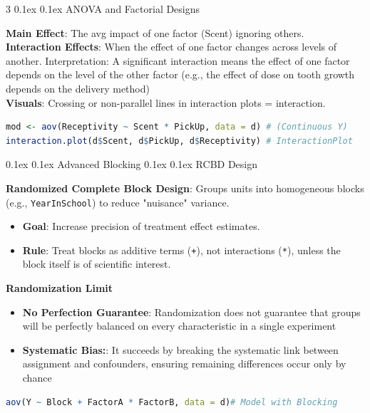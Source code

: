 \documentclass[8pt,landscape]{article}
\makeatletter
\renewcommand{\section}{\@startsection{section}{2}{0pt}%
    {0.1ex}%
    {0.1ex}%
    {\fontsize{8}{9}\bfseries\color{red}}} %
\renewcommand{\subsection}{\@startsection{subsection}{2}{0pt}%
    {0.1ex}%
    {0.1ex}%
    {\fontsize{8}{9}\bfseries\color{blue}}} %
\newcommand{\code}[1]{\textcolor{myred}{\texttt{#1}}}
\newcommand{\smalltext}[1]{
  {\fontsize{8}{9}\selectfont\sloppy #1\par}
}
\makeatother
\begin{document}
\begin{multicols}{3}
\section{ANOVA and Factorial Designs}
\smalltext{
\textbf{Main Effect}: The avg impact of one factor (Scent) ignoring others.\\
\textbf{Interaction Effects}: When the effect of one factor changes across levels of another. Interpretation: A significant interaction means the effect of one factor depends on the level of the other factor (e.g., the effect of dose on tooth growth depends on the delivery method)\\
\textbf{Visuals}: Crossing or non-parallel lines in interaction plots = interaction.
}
\begin{lstlisting}[language=R]
mod <- aov(Receptivity ~ Scent * PickUp, data = d) # (Continuous Y)
interaction.plot(d$Scent, d$PickUp, d$Receptivity) # InteractionPlot
\end{lstlisting}

\section{Advanced Blocking}
\subsection{RCBD Design}
\smalltext{
\textbf{Randomized Complete Block Design}: Groups units into homogeneous blocks (e.g., \code{YearInSchool}) to reduce "nuisance" variance. 
\begin{itemize}
    \item \textbf{Goal}: Increase precision of treatment effect estimates.
    \item \textbf{Rule}: Treat blocks as additive terms (\code{+}), not interactions (\code{*}), unless the block itself is of scientific interest.
\end{itemize}
}
\textbf{Randomization Limit} 
\begin{itemize}
    \item \textbf{No Perfection Guarantee}: Randomization does not guarantee that groups will be perfectly balanced on every characteristic in a single experiment
    \item \textbf{Systematic Bias:}: It succeeds by breaking the systematic link between assignment and confounders, ensuring remaining differences occur only by chance
\end{itemize}
\begin{lstlisting}[language=R]
aov(Y ~ Block + FactorA * FactorB, data = d)# Model with Blocking
\end{lstlisting}


\end{multicols}
\end{document}
